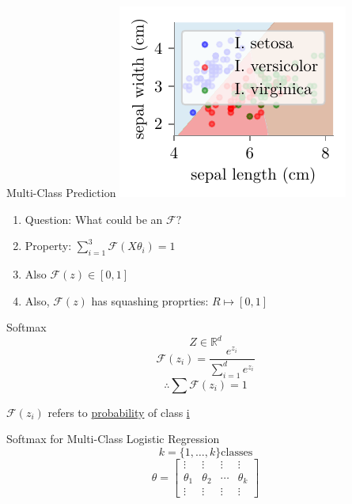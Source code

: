 \documentclass{beamer}
\begin{document}
\begin{frame}{Multi-Class Prediction}
\includegraphics[scale=0.8]{../figures/logistic-regression/logisitic-iris-prediction.pdf}
\pause \begin{enumerate}
	\item Question: What could be an $\mathcal{F}?$
	\item Property: $\sum_{i=1}^{3}\mathcal{F}{({X\theta_i})} = 1$
	\item Also $\mathcal{F}(z)\in [0, 1]$
	\item Also, $\mathcal{F}(z)$ has squashing proprties: $R \mapsto [0, 1]$
\end{enumerate}


\end{frame}
\begin{frame}{Softmax}
\begin{equation*}
Z \in \mathbb{R}^{d}
\end{equation*}
\begin{equation*}
\mathcal{F}(z_{i}) = \frac{e^{z_{i}}}{\sum_{i=1}^{d}e^{z_{i}}}
\end{equation*}
\begin{equation*}
\therefore \sum \mathcal{F}(z_{i}) = 1
\end{equation*}

$\mathcal{F}(z_{i})$ refers to \underline{probability} of class \underline{i}
\end{frame}
\begin{frame}{Softmax for Multi-Class Logistic Regression}
\begin{equation*}
k = \{1, \ldots, k\} \text{classes}
\end{equation*}
$$
\theta=\left[\begin{array}{llll}
{\vdots} & {\vdots} & {\vdots} & {\vdots} \\
{\theta_{1}} & {\theta_{2}} & {\cdots} & {\theta_{k}} \\
{\vdots} & {\vdots} & {\vdots} & {\vdots} 	
\end{array}\right]
$$
\centering
{}
\end{frame}
\end{document}
